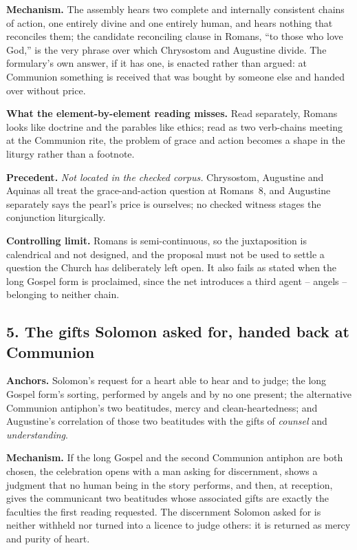 \textbf{Mechanism.} The assembly hears two complete and internally consistent chains of action, one entirely divine and one entirely human, and hears nothing that reconciles them; the candidate reconciling clause in Romans, ``to those who love God,'' is the very phrase over which Chrysostom and Augustine divide. The formulary's own answer, if it has one, is enacted rather than argued: at Communion something is received that was bought by someone else and handed over without price.

\textbf{What the element-by-element reading misses.} Read separately, Romans looks like doctrine and the parables like ethics; read as two verb-chains meeting at the Communion rite, the problem of grace and action becomes a shape in the liturgy rather than a footnote.

\textbf{Precedent.} \emph{Not located in the checked corpus.} Chrysostom, Augustine and Aquinas all treat the grace-and-action question at Romans~8, and Augustine separately says the pearl's price is ourselves; no checked witness stages the conjunction liturgically.

\textbf{Controlling limit.} Romans is semi-continuous, so the juxtaposition is calendrical and not designed, and the proposal must not be used to settle a question the Church has deliberately left open. It also fails as stated when the long Gospel form is proclaimed, since the net introduces a third agent -- angels -- belonging to neither chain.

\subsection*{5. The gifts Solomon asked for, handed back at Communion}

\textbf{Anchors.} Solomon's request for a heart able to hear and to judge; the long Gospel form's sorting, performed by angels and by no one present; the alternative Communion antiphon's two beatitudes, mercy and clean-heartedness; and Augustine's correlation of those two beatitudes with the gifts of \emph{counsel} and \emph{understanding}.

\textbf{Mechanism.} If the long Gospel and the second Communion antiphon are both chosen, the celebration opens with a man asking for discernment, shows a judgment that no human being in the story performs, and then, at reception, gives the communicant two beatitudes whose associated gifts are exactly the faculties the first reading requested. The discernment Solomon asked for is neither withheld nor turned into a licence to judge others: it is returned as mercy and purity of heart.

